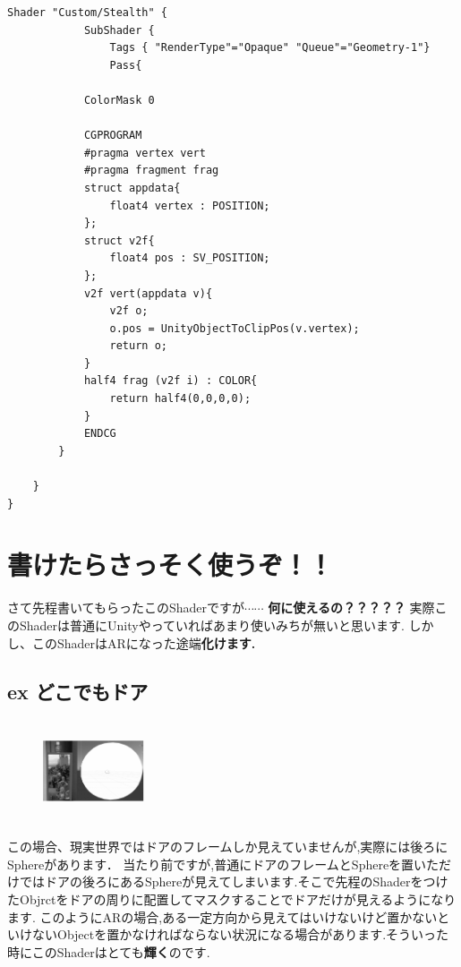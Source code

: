 \begin{verbatim}
Shader "Custom/Stealth" {
            SubShader {
                Tags { "RenderType"="Opaque" "Queue"="Geometry-1"}
                Pass{

            ColorMask 0

            CGPROGRAM
            #pragma vertex vert
            #pragma fragment frag
            struct appdata{
                float4 vertex : POSITION;
            };
            struct v2f{
                float4 pos : SV_POSITION;
            };
            v2f vert(appdata v){
                v2f o;
                o.pos = UnityObjectToClipPos(v.vertex);
                return o;
            }
            half4 frag (v2f i) : COLOR{
                return half4(0,0,0,0);
            }
            ENDCG
        }
        
    }
}
\end{verbatim}

\section{書けたらさっそく使うぞ！！}
さて先程書いてもらったこのShaderですが$\cdots \cdots$
{\bf 何に使えるの？？？？？}
実際このShaderは普通にUnityやっていればあまり使いみちが無いと思います.
しかし、このShaderはARになった途端\bf{化けます}.

\subsection{ex どこでもドア}
\begin{figure}[htbp]
\centering
\includegraphics[width=3cm,height=3cm]{./assets/yuhiasset/hsau_dosei3.png}
\end{figure}
この場合、現実世界ではドアのフレームしか見えていませんが,実際には後ろにSphereがあります．
当たり前ですが,普通にドアのフレームとSphereを置いただけではドアの後ろにあるSphereが見えてしまいます.そこで先程のShaderをつけたObjrctをドアの周りに配置してマスクすることでドアだけが見えるようになります.
このようにARの場合,ある一定方向から見えてはいけないけど置かないといけないObjectを置かなければならない状況になる場合があります.そういった時にこのShaderはとても{\bf 輝く}のです.

